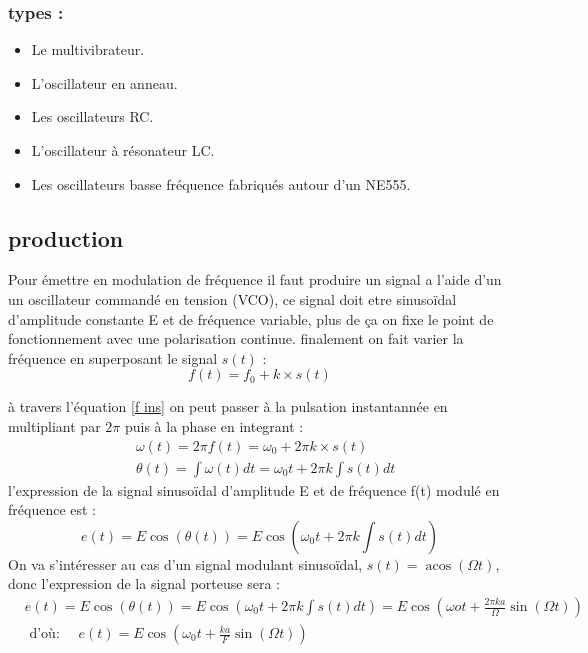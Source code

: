 \documentclass[12pt,a4paper,hidelinks,oneside]{book}
\begin{document}
\subsubsection{types :}
\begin{itemize}
	\item Le multivibrateur.
	\item L'oscillateur en anneau.
	\item Les oscillateurs RC.
	\item L'oscillateur à résonateur LC.
	\item Les oscillateurs basse fréquence fabriqués autour d'un NE555.
\end{itemize}

\subsection{production}
Pour émettre en modulation de fréquence il faut produire un signal a l'aide d'un un oscillateur commandé en tension (VCO), ce signal
doit etre sinusoïdal d’amplitude constante E et de fréquence variable, plus de ça on fixe le point de fonctionnement avec une polarisation
continue. finalement on fait varier la fréquence en superposant le signal $s\left(t\right)$ :
\begin{equation}
f(t)=f_{0}+k \times s(t) \label{f ins}
\end{equation}

à travers l'équation \ref{f ins} on peut passer à la pulsation instantannée en multipliant par $2\pi$ puis à la phase en integrant :
\begin{equation}
\begin{aligned}
&\omega(t)=2 \pi f(t)=\omega_{0}+2 \pi k\times s(t)\\
&\theta(t)=\int \omega(t) d t=\omega_{0} t+2 \pi k \int s(t)d t
\end{aligned}
\end{equation}
l'expression de la signal sinusoïdal d'amplitude E et de fréquence f(t) modulé en fréquence est : 
\begin{equation}
e(t)=E \cos (\theta(t))=E \cos \left(\omega_{0} t+2 \pi k \int s(t) d t\right)
\end{equation}
On va s'intéresser au cas d'un signal modulant sinusoïdal, $s(t)=\operatorname{acos}(\Omega t)$, donc l'expression de la signal porteuse sera :
\begin{equation}
\begin{aligned}
&e(t)=E \cos (\theta(t))=E \cos \left(\omega_{0} t+2 \pi k \int s(t) d t\right)=E \cos \left(\omega o t+\frac{2 \pi k a}{\Omega} \sin (\Omega t)\right)\\
&\text { d'où: } \quad e(t)=E \cos \left(\omega_{0} t+\frac{k a}{F} \sin (\Omega t)\right)
\end{aligned}
\end{equation}
\end{document}

